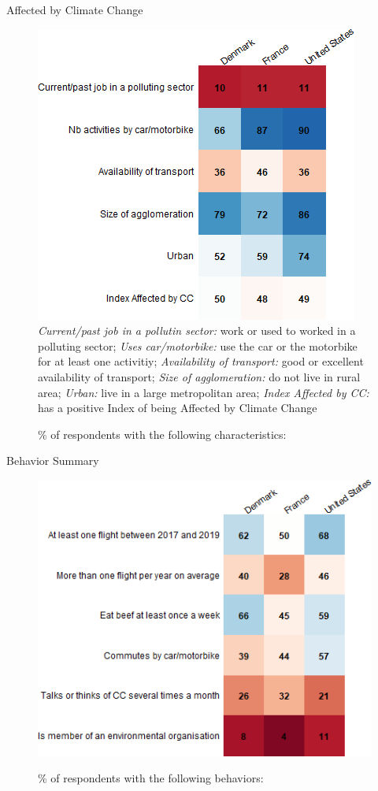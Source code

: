 \documentclass[aspectratio=169,9pt,dvipsnames]{beamer}
\begin{document}
\begin{frame}{Affected by Climate Change}%
\begin{figure}[h!]
\caption{\% of respondents with the following characteristics:}
\includegraphics[width=.4\textwidth]{../figures/country_comparison/affected_positive_countries.png} \\
\footnotesize{\textit{Current/past job in a pollutin sector:} work or used to worked in a polluting sector; \textit{Uses car/motorbike:} use the car or the motorbike for at least one activitiy; \textit{Availability of transport:} good or excellent availability of transport; \textit{Size of agglomeration:} do not live in rural area; \textit{Urban:} live in a large metropolitan area; \textit{Index Affected by CC:} has a positive Index of being Affected by Climate Change}
\end{figure}
\end{frame}


\begin{frame}{Behavior Summary}%
\begin{figure}[h!]
\caption{\% of respondents with the following behaviors:}
\includegraphics[width=.6\textwidth]{../figures/country_comparison/behavior_countries.png} \\
\end{figure}
\end{frame}
\end{document}
